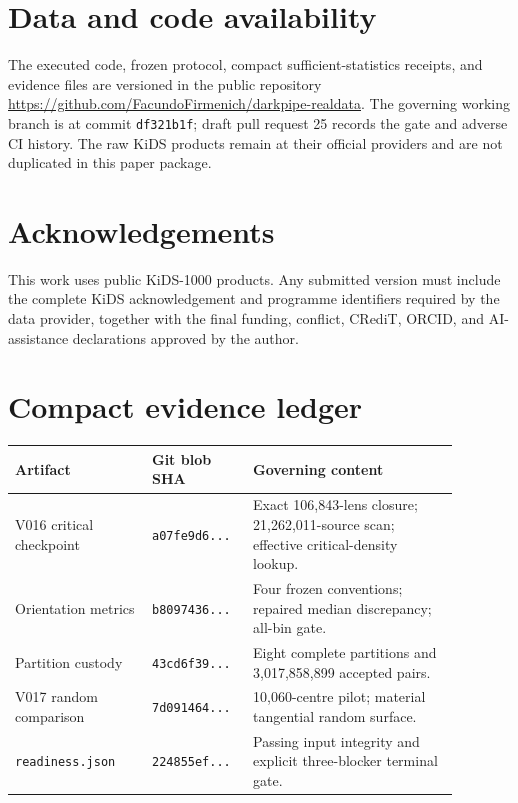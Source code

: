 \documentclass[11pt]{article}
\begin{document}
\section*{Data and code availability}

The executed code, frozen protocol, compact sufficient-statistics receipts, and
evidence files are versioned in the public repository
\url{https://github.com/FacundoFirmenich/darkpipe-realdata}. The governing
working branch is  at commit
\texttt{df321b1f}; draft pull request 25
records the gate and adverse CI history. The raw KiDS products remain at their
official providers and are not duplicated in this paper package.

\section*{Acknowledgements}

This work uses public KiDS-1000 products. Any submitted version must include
the complete KiDS acknowledgement and programme identifiers required by the
data provider, together with the final funding, conflict, CRediT, ORCID, and
AI-assistance declarations approved by the author.




\appendix
\section{Compact evidence ledger}

\begin{longtable}{p{0.28\linewidth}p{0.18\linewidth}p{0.42\linewidth}}
\toprule
Artifact & Git blob SHA & Governing content \\
\midrule
\endhead
V016 critical checkpoint &
\texttt{a07fe9d6...} & Exact 106,843-lens closure; 21,262,011-source scan; effective critical-density lookup.\\
Orientation metrics &
\texttt{b8097436...} & Four frozen conventions; repaired median discrepancy; all-bin gate.\\
Partition custody &
\texttt{43cd6f39...} & Eight complete partitions and 3,017,858,899 accepted pairs.\\
V017 random comparison &
\texttt{7d091464...} & 10,060-centre pilot; material tangential random surface.\\
\texttt{readiness.json} &
\texttt{224855ef...} & Passing input integrity and explicit three-blocker terminal gate.\\
\bottomrule
\end{longtable}
\end{document}
